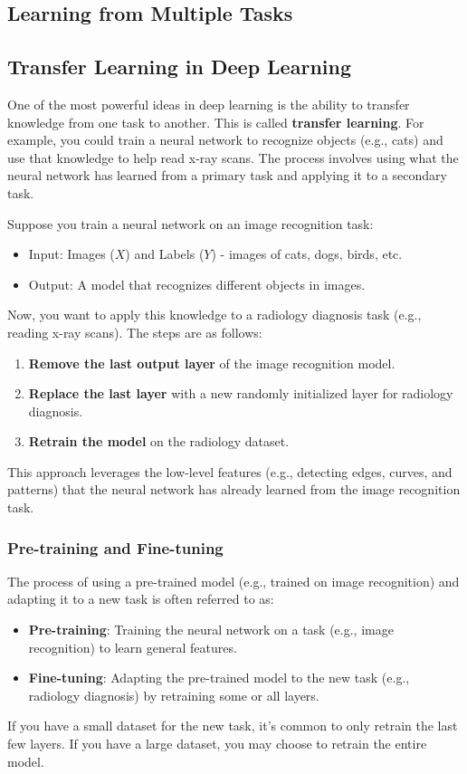 \documentclass[letterpaper,12pt,notitlepage,twoside]{report}
\begin{document}
\subsection{Learning from Multiple Tasks}
\subsection*{Transfer Learning in Deep Learning}
One of the most powerful ideas in deep learning is the ability to transfer knowledge from one task to another. This is called \textbf{transfer learning}. For example, you could train a neural network to recognize objects (e.g., cats) and use that knowledge to help read x-ray scans. The process involves using what the neural network has learned from a primary task and applying it to a secondary task.

Suppose you train a neural network on an image recognition task:
\begin{itemize}[nosep]
    \item Input: Images (\(X\)) and Labels (\(Y\)) - images of cats, dogs, birds, etc.
    \item Output: A model that recognizes different objects in images.
\end{itemize}

Now, you want to apply this knowledge to a radiology diagnosis task (e.g., reading x-ray scans). The steps are as follows:
\begin{enumerate}[nosep]
    \item \textbf{Remove the last output layer} of the image recognition model.
    \item \textbf{Replace the last layer} with a new randomly initialized layer for radiology diagnosis.
    \item \textbf{Retrain the model} on the radiology dataset.
\end{enumerate}
This approach leverages the low-level features (e.g., detecting edges, curves, and patterns) that the neural network has already learned from the image recognition task.

\subsubsection*{Pre-training and Fine-tuning}
The process of using a pre-trained model (e.g., trained on image recognition) and adapting it to a new task is often referred to as:
\begin{itemize}
    \item \textbf{Pre-training}: Training the neural network on a task (e.g., image recognition) to learn general features.
    \item \textbf{Fine-tuning}: Adapting the pre-trained model to the new task (e.g., radiology diagnosis) by retraining some or all layers.
\end{itemize}
If you have a small dataset for the new task, it's common to only retrain the last few layers. If you have a large dataset, you may choose to retrain the entire model.
\end{document}
